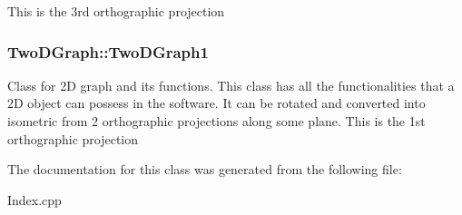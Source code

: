 This is the 3rd orthographic projection 
\subsubsection[{\texorpdfstring{Two\+D\+Graph1}{TwoDGraph1}}]{ Two\+D\+Graph\+::\+Two\+D\+Graph1}\hypertarget{classTwoDGraph_ae842ed89c9e1e66c81aaecae003510f3}{}\label{classTwoDGraph_ae842ed89c9e1e66c81aaecae003510f3}
Class for 2D graph and its functions. This class has all the functionalities that a 2D object can possess in the software. It can be rotated and converted into isometric from 2 orthographic projections along some plane. This is the 1st orthographic projection 

The documentation for this class was generated from the following file\+:\begin{DoxyCompactItemize}
\item 
Index.\+cpp\end{DoxyCompactItemize}
